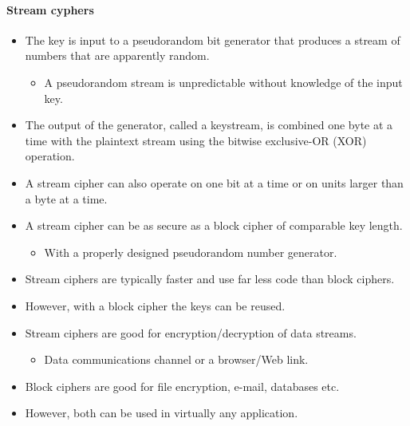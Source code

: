 \documentclass{article}
\begin{document}
                            \paragraph{Stream cyphers}
                            \begin{itemize}
                                \item The key is input to a pseudorandom bit generator that produces a stream of numbers that are apparently random.
                                \begin{itemize}
                                    \item A pseudorandom stream is unpredictable without knowledge of the input key.
                                \end{itemize}    
                                \item The output of the generator, called a keystream, is combined one byte at a time with the plaintext stream using the bitwise exclusive-OR (XOR) operation.
                                \item A stream cipher can also operate on one bit at a time or on units larger than a byte at a time.
                                \item A stream cipher can be as secure as a block cipher of comparable key length.
                                \begin{itemize}
                                    \item With a properly designed pseudorandom number generator.
                                \end{itemize}
                                \item Stream ciphers are typically faster and use far less code than block ciphers.
                                \item However, with a block cipher the keys can be reused.
                                \item Stream ciphers are good for encryption/decryption of data streams.
                                \begin{itemize}
                                    \item Data communications channel or a browser/Web link.
                                \end{itemize}
                                \item Block ciphers are good for file encryption, e-mail, databases etc.
                                \item However, both can be used in virtually any application.
                            \end{itemize}
\end{document}
